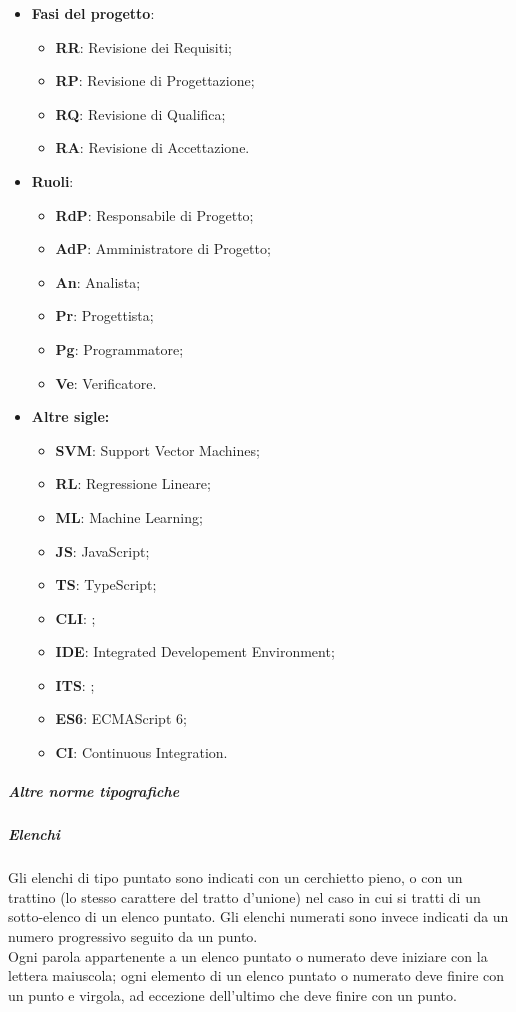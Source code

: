 \documentclass[../norme-di-progetto.tex]{subfiles}
\begin{document}
\begin{itemize}
  \item \textbf{Fasi del progetto}:
  \begin{itemize}
  \item \textbf{RR}: Revisione dei Requisiti;
  \item \textbf{RP}: Revisione di Progettazione;
  \item \textbf{RQ}: Revisione di Qualifica;
  \item \textbf{RA}: Revisione di Accettazione.
  \end{itemize}
  \item \textbf{Ruoli}:
  \begin{itemize}
  \item \textbf{RdP}: Responsabile di Progetto;
  \item \textbf{AdP}: Amministratore di Progetto;
  \item \textbf{An}: Analista;
  \item \textbf{Pr}: Progettista;
  \item \textbf{Pg}: Programmatore;
  \item \textbf{Ve}: Verificatore.
  \end{itemize}
  \item \textbf{Altre sigle:}
  \begin{itemize}
    \item \textbf{SVM}: Support Vector Machines;
    \item \textbf{RL}: Regressione Lineare;
    \item \textbf{ML}: Machine Learning;
    \item \textbf{JS}: JavaScript;
    \item \textbf{TS}: TypeScript;
    \item \textbf{CLI}: ;
    \item \textbf{IDE}: Integrated Developement Environment;
    \item \textbf{ITS}: ;
    \item \textbf{ES6}: ECMAScript 6;
    \item \textbf{CI}: Continuous Integration.
  \end{itemize}
\end{itemize}

\subparagraph*{Altre norme tipografiche}
\subparagraph*{Elenchi}
Gli elenchi di tipo puntato sono indicati con un cerchietto pieno, o con un trattino (lo stesso carattere del tratto d'unione) nel caso in cui si tratti di un sotto-elenco di un elenco puntato. Gli elenchi numerati sono invece indicati da un numero progressivo seguito da un punto. \\
Ogni parola appartenente a un elenco puntato o numerato deve iniziare con la lettera maiuscola; ogni elemento di un elenco puntato o numerato deve finire con un punto e virgola, ad eccezione dell'ultimo che deve finire con un punto.
\end{document}
